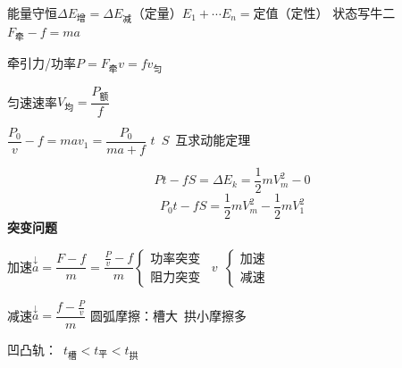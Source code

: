 能量守恒\quad $\Delta E_{\text{增}}=\Delta E_{\text{减}}$（定量）\quad $E_1+\cdots E_n=$定值（定性）
状态写牛二\quad $F_{\text{牵}}-f=ma$

牵引力/功率\quad $P=F_{\text{牵}}v=fv_{\text{匀}}$

匀速速率\quad $V_{\text{均}}=\dfrac{P_{\text{额}}}{f}$ %


$\dfrac{P_0}{v}-f=ma$\qquad $v_1=\dfrac{P_0}{ma+f}$
$t$\ $S$\ 互求\quad 动能定理

\[
Pt-fS=\Delta E_k=\frac{1}{2}mV_m^2-0
\]
\[
P_0t-fS=\frac{1}{2}mV_m^2-\frac{1}{2}mV_1^2
\]
\textbf{突变问题}

加速\quad $\overset{\downarrow}{a}=\dfrac{F-f}{m}=\dfrac{\frac{P}{v}-f}{m}$\quad $\left\{\begin{array}{l}\text{功率突变}\\ \text{阻力突变}\end{array}\right.$\ $v$\ $\left\{\begin{array}{l}\text{加速}\\ \text{减速}\end{array}\right.$

减速\quad $\overset{\downarrow}{a}=\dfrac{f-\frac{P}{v}}{m}$
圆弧摩擦：槽大\ 拱小\quad 摩擦多

凹凸轨：\ $t_{\text{槽}}<t_{\text{平}}<t_{\text{拱}}$

